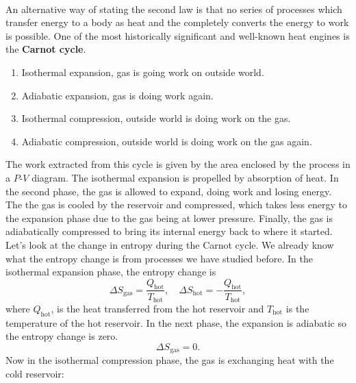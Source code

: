 \documentclass[../thermodynamics.tex]{subfiles}
\begin{document}
        \paragraph{}
        An alternative way of stating the second law is that no series of processes which transfer energy to a body as heat and the completely converts the energy to work is possible.
        One of the most historically significant and well-known heat engines is the \textbf{Carnot cycle}.
        \begin{enumerate}[label={\upshape(\roman*)}]
            \item Isothermal expansion, gas is going work on outside world.
            \item Adiabatic expansion, gas is doing work again.
            \item Isothermal compression, outside world is doing work on the gas.
            \item Adiabatic compression, outside world is doing work on the gas again.
        \end{enumerate}
        The work extracted from this cycle is given by the area enclosed by the process in a $P$-$V$ diagram.
        The isothermal expansion is propelled by absorption of heat.
        In the second phase, the gas is allowed to expand, doing work and losing energy.
        The the gas is cooled by the reservoir and compressed, which takes less energy to the expansion phase due to the gas being at lower pressure.
        Finally, the gas is adiabatically compressed to bring its internal energy back to where it started.
        Let's look at the change in entropy during the Carnot cycle.
        We already know what the entropy change is from processes we have studied before.
        In the isothermal expansion phase, the entropy change is
        \begin{equation}
            \Delta S_\text{gas}=\frac{Q_\text{hot}}{T_\text{hot}},\quad\Delta S_\text{hot}=-\frac{Q_\text{hot}}{T_\text{hot}},
        \end{equation}
        where $Q_\text{hot}$, is the heat transferred from the hot reservoir and $T_\text{hot}$ is the temperature of the hot reservoir.
        In the next phase, the expansion is adiabatic so the entropy change is zero.
        \begin{equation}
            \Delta S_\text{gas}=0.
        \end{equation}
        Now in the isothermal compression phase, the gas is exchanging heat with the cold reservoir:
\end{document}
